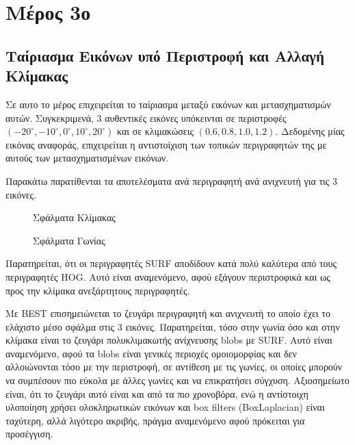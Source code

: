 \documentclass{article}
\newcommand{\eng}[1]{\foreignlanguage{english}{#1}}
\begin{document}
\section{Μέρος 3ο}

\subsection{Ταίριασμα Εικόνων υπό Περιστροφή και Αλλαγή Κλίμακας}

Σε αυτο το μέρος επιχειρείται το ταίριασμα μεταξύ εικόνων και μετασχηματισμών αυτών. Συγκεκριμενά, 3 αυθεντικές εικόνες υπόκεινται σε περιστροφές $(-20^{\circ}, -10^{\circ}, 0^{\circ}, 10^{\circ}, 20^{\circ})$ και σε κλιμακώσεις  $(0.6, 0.8, 1.0, 1.2)$. Δεδομένης μίας εικόνας αναφοράς, επιχειρείται η αντιστοίχιση των τοπικών περιγραφητών της με αυτούς των μετασχηματισμένων εικόνων.

Παρακάτω παρατίθενται τα αποτελέσματα ανά περιγραφητή ανά ανιχνευτή για τις 3 εικόνες.

\begin{figure}[h]
    
    \caption{Σφάλματα Κλίμακας}
\end{figure}

\begin{figure}[h]
    
    \caption{Σφάλματα Γωνίας}
\end{figure}

Παρατηρείται, ότι οι περιγραφητές \eng{SURF} αποδίδουν κατά πολύ καλύτερα από τους περιγραφητές \eng{HOG}. Αυτό είναι αναμενόμενο, αφού εξάγουν περιστροφικά και ως προς την κλίμακα ανεξάρτητους περιγραφητές.

Με \eng{BEST} επισημειώνεται το ζευγάρι περιγραφητή και ανιχνευτή το οποίο έχει το ελάχιστο μέσο σφάλμα στις 3 εικόνες. Παρατηρείται, τόσο στην γωνία όσο και στην κλίμακα είναι το ζευγάρι πολυκλιμακωτής ανίχνευσης \eng{blobs} με \eng{SURF}. Αυτό είναι αναμενόμενο, αφού τα \eng{blobs} είναι γενικές περιοχές ομοιομορφίας και δεν αλλοιώνονται τόσο με την περιστροφή, σε αντίθεση με τις γωνίες, οι οποίες μπορούν να συμπέσουν πιο εύκολα με άλλες γωνίες και να επικρατήσει σύγχυση. Αξιοσημείωτο είναι, ότι το ζευγάρι αυτό είναι και από τα πιο χρονοβόρα, ενώ η αντίστοιχη υλοποίηση χρήσει ολοκληρωτικών εικόνων και \eng{box filters} (BoxLaplacian) είναι ταχύτερη, αλλά λιγότερο ακριβής, πράγμα αναμενόμενο αφού πρόκειται για προσέγγιση.
\end{document}
